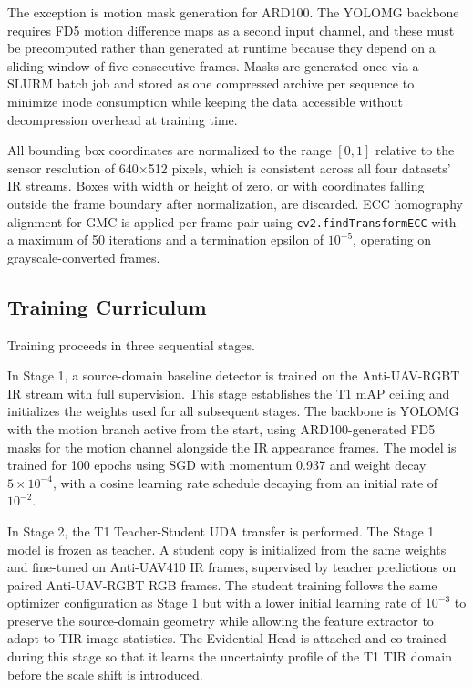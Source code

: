 \documentclass[nolinenumbering]{thesisdesign}
\begin{document}
The exception is motion mask generation for ARD100. The YOLOMG backbone requires FD5 motion difference maps as a second input channel, and these must be precomputed rather than generated at runtime because they depend on a sliding window of five consecutive frames. Masks are generated once via a SLURM batch job and stored as one compressed archive per sequence to minimize inode consumption while keeping the data accessible without decompression overhead at training time.

All bounding box coordinates are normalized to the range $[0, 1]$ relative to the sensor resolution of 640$\times$512 pixels, which is consistent across all four datasets' IR streams. Boxes with width or height of zero, or with coordinates falling outside the frame boundary after normalization, are discarded. ECC homography alignment for GMC is applied per frame pair using \texttt{cv2.findTransformECC} with a maximum of 50 iterations and a termination epsilon of $10^{-5}$, operating on grayscale-converted frames.


\subsection{Training Curriculum}
\label{sec:training}

Training proceeds in three sequential stages.

In Stage 1, a source-domain baseline detector is trained on the Anti-UAV-RGBT IR stream with full supervision. This stage establishes the T1 mAP ceiling and initializes the weights used for all subsequent stages. The backbone is YOLOMG with the motion branch active from the start, using ARD100-generated FD5 masks for the motion channel alongside the IR appearance frames. The model is trained for 100 epochs using SGD with momentum 0.937 and weight decay $5 \times 10^{-4}$, with a cosine learning rate schedule decaying from an initial rate of $10^{-2}$.

In Stage 2, the T1 Teacher-Student UDA transfer is performed. The Stage 1 model is frozen as teacher. A student copy is initialized from the same weights and fine-tuned on Anti-UAV410 IR frames, supervised by teacher predictions on paired Anti-UAV-RGBT RGB frames. The student training follows the same optimizer configuration as Stage 1 but with a lower initial learning rate of $10^{-3}$ to preserve the source-domain geometry while allowing the feature extractor to adapt to TIR image statistics. The Evidential Head is attached and co-trained during this stage so that it learns the uncertainty profile of the T1 TIR domain before the scale shift is introduced.
\end{document}
